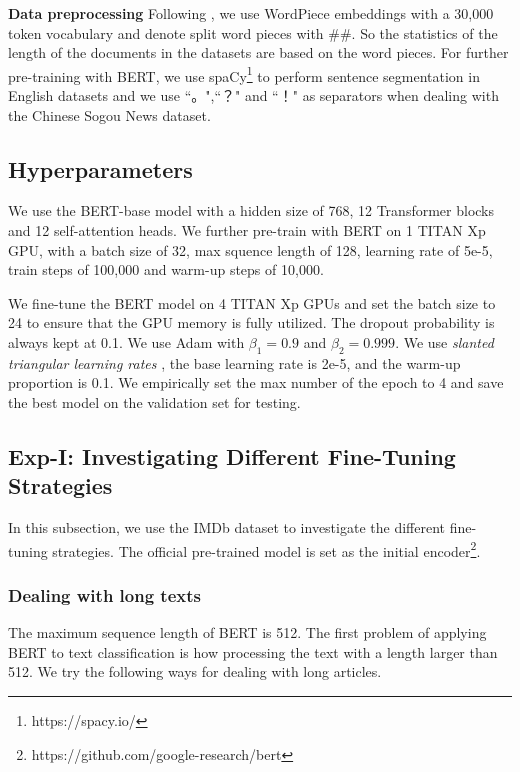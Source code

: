 \documentclass[11pt,a4paper]{article}
\theoremstyle{definition}
\begin{document}
\begin{CJK*}{UTF8}{gbsn}
	{\noindent \textbf{Data preprocessing}}
	\quad Following \citet{devlin2018bert}, we use WordPiece embeddings \cite{wu2016google} with a 30,000 token vocabulary and denote split word pieces with \#\#. So the statistics of the length of the documents in the datasets are based on the word pieces. For further pre-training with BERT, we use spaCy\footnote{https://spacy.io/} to perform sentence segmentation in English datasets and we use ``。",``？" and ``！" as separators when dealing with the Chinese Sogou News dataset.
	
	\subsection{Hyperparameters}
	We use the BERT-base model \cite{devlin2018bert} with a hidden size of 768, 12 Transformer blocks \cite{vaswani2017attention} and 12 self-attention heads. We further pre-train with BERT on 1 TITAN Xp GPU, with a batch size of 32, max squence length of 128, learning rate of 5e-5, train steps of 100,000 and warm-up steps of 10,000.
	
	We fine-tune the BERT model on 4 TITAN Xp GPUs and set the batch size to 24 to ensure that the GPU memory is fully utilized. The dropout probability is always kept at 0.1. We use Adam with $\beta_1=0.9$ and $\beta_2=0.999$. We use \textit{slanted triangular learning rates} \cite{howard2018universal}, the base learning rate is 2e-5, and the warm-up proportion is 0.1. We empirically set the max number of the epoch to 4 and save the best model on the validation set for testing.

\subsection{Exp-I: Investigating Different Fine-Tuning Strategies} \label{sec:exp-fit}

In this subsection, we use the IMDb dataset to investigate the different fine-tuning strategies. The official pre-trained model is set as the initial encoder\footnote{https://github.com/google-research/bert}.


\subsubsection{Dealing with long texts}

The maximum sequence length of BERT is 512. The first problem of applying BERT to text classification is how processing the text with a length larger than 512. We try the following ways for dealing with long articles.


\end{CJK*}
\end{document}
